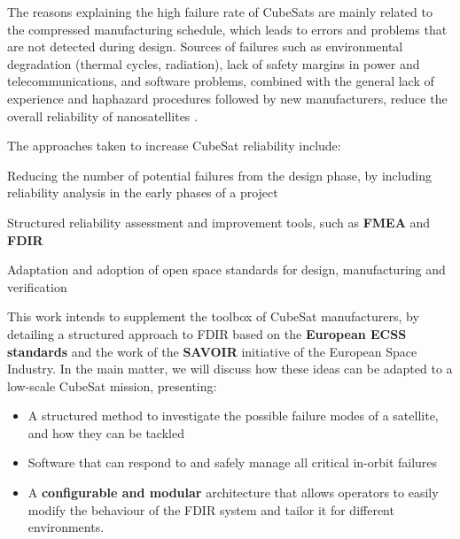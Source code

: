 \documentclass[a4paper,nobib]{tufte-book}
\begin{document}
The reasons explaining the high failure rate of CubeSats are mainly related to the compressed manufacturing schedule, which leads to errors and problems that are not detected during design. Sources of failures such as environmental degradation (thermal cycles, radiation), lack of safety margins in power and telecommunications, and software problems, combined with the general lack of experience and haphazard procedures followed by new manufacturers, reduce the overall reliability of nanosatellites \autocite{swartwout_cubesat_mission_2019,langer_reliability_estimation_2017}.

The approaches taken to increase CubeSat reliability include:
\begin{compactitem}
	\item Reducing the number of potential failures from the design phase, by including reliability analysis in the early phases of a project
	\item Structured reliability assessment and improvement tools, such as \textbf{\acf{FMEA}} and \textbf{\acf{FDIR}} \autocite{faure_lean_satellites_2017,menchinelli_reliability_engineering_2018}
	\item Adaptation and adoption of open space standards for design, manufacturing and verification
\end{compactitem}


This work intends to supplement the toolbox of CubeSat manufacturers, by detailing a structured approach to \ac{FDIR} based on the \textbf{European \acs{ECSS} standards} and the work of the \textbf{\acs{SAVOIR}} initiative of the European Space Industry. In the main matter, we will discuss how these ideas can be adapted to a low-scale CubeSat mission, presenting:
\begin{itemize}
	\item A structured method to investigate the possible failure modes of a satellite, and how they can be tackled
	\item Software that can respond to and safely manage all critical in-orbit failures
	\item A \textbf{configurable and modular} architecture that allows operators to easily modify the behaviour of the \acs{FDIR} system and tailor it for different environments.
\end{itemize}
\end{document}
